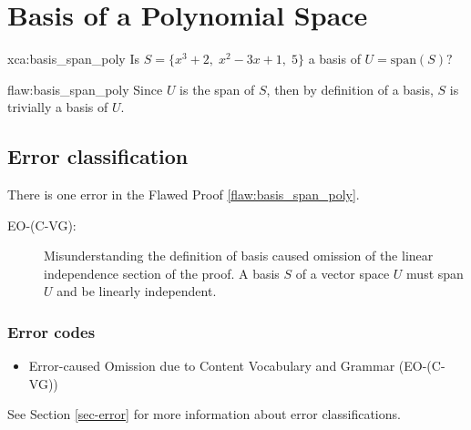 \section{Basis of a Polynomial Space }

\begin{xca}{xca:basis_span_poly}
Is $S = \{ x^3 + 2, \; x^2-3x+1, \; 5 \}$ a basis of $U =\text{span}(S)?$
\end{xca}

\begin{flaw}{flaw:basis_span_poly} %
Since $U$ is the span of $S$, then by definition of a basis, $S$ is trivially a basis of $U.$
\end{flaw}

\clearpage
\subsection{Error classification}


There is one error
 in the Flawed Proof \ref{flaw:basis_span_poly}. %


 \begin{description}
 	\item[EO-(C-VG):] Misunderstanding the definition of basis caused omission of the linear independence section of the proof. A basis $S$ of a vector space $U$ must span $U$ and be linearly independent.
 \end{description}


\subsubsection{Error codes}
\begin{itemize}
	\item 	Error-caused Omission due to Content Vocabulary and Grammar (EO-(C-VG))
\end{itemize}
See Section \ref{sec-error} for more information about error classifications.

